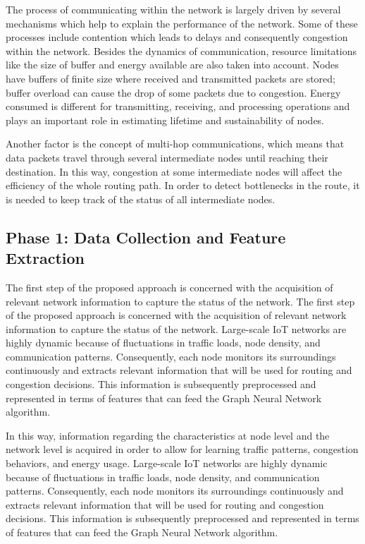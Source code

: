 \documentclass[a4paper,fleqn]{cas-dc}
\numberwithin{equation}{section}
\begin{document}
The process of communicating within the network is largely driven by several mechanisms which help to explain the performance of the network. Some of these processes include contention which leads to delays and consequently congestion within the network.
Besides the dynamics of communication, resource limitations like the size of buffer and energy available are also taken into account. Nodes have buffers of finite size where received and transmitted packets are stored; buffer overload can cause the drop of some packets due to congestion. Energy consumed is different for transmitting, receiving, and processing operations and plays an important role in estimating lifetime and sustainability of nodes.

Another factor is the concept of multi-hop communications, which means that data packets travel through several intermediate nodes until reaching their destination. In this way, congestion at some intermediate nodes will affect the efficiency of the whole routing path. In order to detect bottlenecks in the route, it is needed to keep track of the status of all intermediate nodes.
\subsection{Phase 1: Data Collection and Feature Extraction}
The first step of the proposed approach is concerned with the acquisition of relevant network information to capture the status of the network. The first step of the proposed approach is concerned with the acquisition of relevant network information to capture the status of the network. Large-scale IoT networks are highly dynamic because of fluctuations in traffic loads, node density, and communication patterns. Consequently, each node monitors its surroundings continuously and extracts relevant information that will be used for routing and congestion decisions. This information is subsequently preprocessed and represented in terms of features that can feed the Graph Neural Network algorithm.

In this way, information regarding the characteristics at node level and the network level is acquired in order to allow for learning traffic patterns, congestion behaviors, and energy usage. Large-scale IoT networks are highly dynamic because of fluctuations in traffic loads, node density, and communication patterns. Consequently, each node monitors its surroundings continuously and extracts relevant information that will be used for routing and congestion decisions. This information is subsequently preprocessed and represented in terms of features that can feed the Graph Neural Network algorithm.
\vspace{6pt} 
\end{document}
